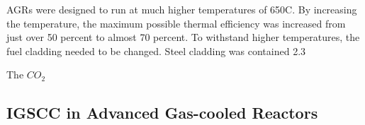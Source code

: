 AGRs were designed to run at much higher temperatures of 650C.  By increasing the temperature, the maximum possible thermal efficiency was increased from just over 50 percent to almost 70 percent.  To withstand higher temperatures, the fuel cladding needed to be changed.  Steel cladding was contained 2.3%

The $CO_{2}$ 





\subsection{IGSCC in Advanced Gas-cooled Reactors}




 

